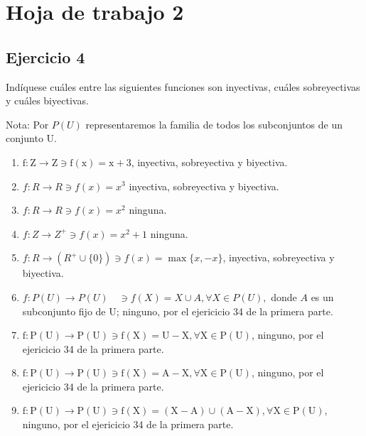\documentclass[a4paper,12pt]{article}
\begin{document}
\section{Hoja de trabajo 2}
\subsection{Ejercicio 4}

Indíquese cuáles entre las siguientes funciones son inyectivas, cuáles sobreyectivas y cuáles biyectivas.\newline\newline

Nota: Por $P(U)$ representaremos la familia de todos los subconjuntos de un conjunto U.
\begin{enumerate}
\item  $\mathrm{f}: \mathrm{Z} \rightarrow \mathrm{Z} \ni \mathrm{f}(\mathrm{x})=\mathrm{x}+3$, inyectiva, sobreyectiva y biyectiva.
\item  $f: R \rightarrow R \ni f(x)=x^{3}$  inyectiva, sobreyectiva y biyectiva.
\item  $f: R \rightarrow R \ni f(x)=x^{2}$ ninguna.
\item  $f: Z \rightarrow Z^{+} \ni f(x)=x^{2}+1$ ninguna.
\item  $f: R \rightarrow(R^+\cup\{0\}) \ni f(x)=\operatorname{max}\{x,-x\}$, inyectiva, sobreyectiva y biyectiva.
\item  $f: P(U) \rightarrow P(U) \quad \ni f(X)=X \cup A, \forall X \in P(U),$ donde $A$ es un
subconjunto fijo de U; ninguno, por el ejericicio 34 de la primera parte.
\item $\mathrm{f}: \mathrm{P}(\mathrm{U}) \rightarrow \mathrm{P}(\mathrm{U}) \ni \mathrm{f}(\mathrm{X})=\mathrm{U}-\mathrm{X}, \forall \mathrm{X} \in \mathrm{P}(\mathrm{U})$, ninguno, por el ejericicio 34 de la primera parte.
\item $\mathrm{f}: \mathrm{P}(\mathrm{U}) \rightarrow \mathrm{P}(\mathrm{U}) \ni \mathrm{f}(\mathrm{X})=\mathrm{A}-\mathrm{X}, \forall \mathrm{X} \in \mathrm{P}(\mathrm{U})$, ninguno, por el ejericicio 34 de la primera parte.
\item $\mathrm{f}: \mathrm{P}(\mathrm{U}) \rightarrow \mathrm{P}(\mathrm{U}) \ni \mathrm{f}(\mathrm{X})=(\mathrm{X}-\mathrm{A}) \cup(\mathrm{A}-\mathrm{X}), \forall \mathrm{X} \in \mathrm{P}(\mathrm{U})$, ninguno, por el ejericicio 34 de la primera parte.
\end{enumerate}
\end{document}
